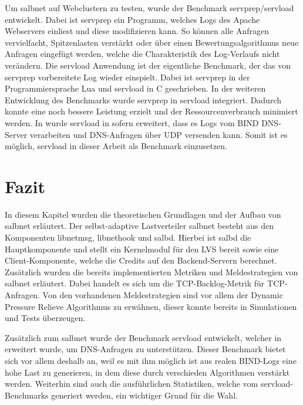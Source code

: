 \documentclass[a4paper, 12pt, BCOR10mm, DIV12, toc=bibliography, toc=listof, german]{scrbook}
\begin{document}
			Um salbnet auf Webclustern zu testen, wurde der Benchmark servprep/servload
			\cite{habenschuss2011} entwickelt. Dabei ist servprep ein Programm, welches Logs des Apache
			Webservers einliest und diese modifizieren kann. So können alle Anfragen vervielfacht,
			Spitzenlasten verstärkt oder über einen Bewertungsalgorithmus neue Anfragen eingefügt werden,
			welche die Charakteristik des Log-Verlaufs nicht verändern. Die servload Anwendung ist der
			eigentliche Benchmark, der das von servprep vorbereitete Log wieder einspielt. Dabei ist
			servprep in der Programmiersprache Lua und servload in C geschrieben. In der weiteren
			Entwicklung des Benchmarks wurde servprep in servload integriert. Dadurch konnte eine noch
			bessere Leistung erzielt und der Ressourcenverbrauch minimiert werden. In \cite{menski2012}
			wurde servload in sofern erweitert, dass es Logs vom BIND DNS-Server verarbeiten und
			DNS-Anfragen über UDP versenden kann. Somit ist es möglich, servload in dieser Arbeit als
			Benchmark einzusetzen.


		\section{Fazit} %
		\label{sec:salbnet-fazit}

			In diesem Kapitel wurden die theoretischen Grundlagen und der Aufbau von salbnet erläutert.
			Der selbst-adaptive Lastverteiler salbnet besteht aus den Komponenten libnetmsg, libnethook
			und salbd. Hierbei ist salbd die Hauptkomponente und stellt ein Kernelmodul für den LVS bereit
			sowie eine Client-Komponente, welche die Credits auf den Backend-Servern berechnet. Zusätzlich
			wurden die bereits implementierten Metriken und	Meldestrategien von salbnet erläutert. Dabei
			handelt es sich um die TCP-Backlog-Metrik für TCP-Anfragen. Von den vorhandenen
			Meldestrategien sind vor allem der Dynamic Pressure Relieve Algorithmus zu erwähnen, dieser
			konnte bereits in Simulationen und Tests überzeugen.

			Zusätzlich zum salbnet wurde der Benchmark servload entwickelt, welcher in
			\cite{menski2012} erweitert wurde, um DNS-Anfragen zu unterstützen. Dieser
			Benchmark bietet sich vor allem deshalb an, weil es mit ihm möglich ist aus realen
			BIND-Logs eine hohe Last zu generieren, in dem diese durch verschieden Algorithmen
			verstärkt werden. Weiterhin sind auch die ausführlichen Statistiken, welche vom
			servload-Benchmarks generiert werden, ein	wichtiger Grund für die Wahl.
\end{document}
